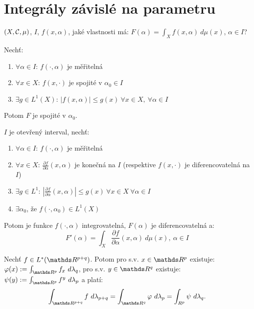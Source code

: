 \documentclass[12pt,a4paper]{article}
\begin{document}
\section{Integrály závislé na parametru}
$(X, \mathcal{ C }, \mu)$, $I$, $f(x,\alpha)$, jaké vlastnosti má: $F(\alpha) = \int_X f(x,\alpha)~d\mu(x)$, $\alpha \in I$?

	Nechť:
	\begin{enumerate}
		\item $\forall \alpha \in I$: $f(\cdot, \alpha)$ je měřitelná
		\item $\forall x \in X$: $f(x, \cdot)$ je spojité v $\alpha_0 \in I$
		\item $\exists g \in L^1(X)$: $|f(x, \alpha)| \leq g(x)~\forall x \in X,~\forall \alpha \in I$
	\end{enumerate}

	Potom $F$ je spojité v $\alpha_0$.

 $I$ je otevřený interval, nechť:
	\begin{enumerate}
		\item $\forall \alpha \in I$: $f(\cdot, \alpha)$ je měřitelná
		\item $\forall x \in X$: $\frac{\partial f}{\partial \alpha}(x,\alpha)$ je konečná na $I$ (respektive $f(x,\cdot)$ je diferencovatelná na $I$)
		\item $\exists g \in L^1$: $|\frac{\partial f}{\partial \alpha}(x,\alpha)| \leq g(x)~\forall x \in X~\forall \alpha \in I$
		\item $\exists \alpha_0$, že $f(\cdot, \alpha_0) \in L^1(X)$
	\end{enumerate}

	Potom je funkce $f(\cdot,\alpha)$ integrovatelná, $F(\alpha)$ je diferencovatelná a:
		$$F'(\alpha) = \int_X \frac{\partial f}{\partial \alpha}(x,\alpha)~d\mu(x),~\alpha \in I$$

\veta[Fubini]
	Nechť $f \in L^*(\R^{p+q})$. Potom pro s.v. $x \in \R^p$ existuje: $\varphi(x) := \int_{\R^p} f_x~d\lambda_q$,
	pro s.v. $y \in \R^q$ existuje: $\psi(y) := \int_{\R^p} f^y~d\lambda_p$ a platí:
		$$\int_{\R^{p+q}} f~d\lambda_{p+q} = \int_{\R^q} \varphi~d\lambda_p = \int_{R^p} \psi~d\lambda_q.$$
\end{document}
